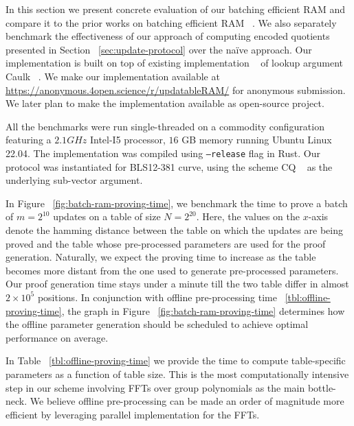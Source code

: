 In this section we present concrete evaluation of our batching efficient RAM and compare it to the
prior works on batching efficient RAM ~\cite{USENIX:OWWB20,CCS:CFHKKO22}.
We also separately benchmark the effectiveness of our approach of computing encoded quotients presented
in Section ~\ref{sec:update-protocol} over the na\"{i}ve approach.
Our implementation is built on top of existing implementation ~\cite{caulk-implementation}
of lookup argument Caulk ~\cite{CCS:ZBKMNS22}. We make our implementation available at
\url{https://anonymous.4open.science/r/updatableRAM/} for anonymous submission. We later plan to
make the implementation available as open-source project.

 All the benchmarks were run single-threaded on a commodity configuration featuring a
$2.1GHz$ Intel-I5 processor, $16$ GB memory running Ubuntu Linux 22.04. The implementation was compiled using {\tt --release}
flag in Rust. Our protocol was instantiated for BLS12-381 curve, using the scheme CQ ~\cite{EPRINT:EagFioGab22}
as the underlying sub-vector argument.

 In Figure ~\ref{fig:batch-ram-proving-time}, we benchmark the time
to prove a batch of $m=2^{10}$ updates on a table of size $N=2^{20}$. Here, the values on the $x$-axis denote
the hamming distance between the table on which the updates are being proved and the table whose pre-processed
parameters are used for the proof generation. Naturally, we expect the proving time to increase as the table
becomes more distant from the one used to generate pre-processed parameters. Our proof generation time stays
under a minute till the two table differ in almost $2\times 10^5$ positions. In conjunction with offline
pre-processing time ~\ref{tbl:offline-proving-time}, the graph in Figure ~\ref{fig:batch-ram-proving-time}
determines how the offline parameter generation should be scheduled to achieve optimal performance on average.

 In Table ~\ref{tbl:offline-proving-time} we provide the time to compute
table-specific parameters as a function of table size. This is the most computationally intensive step in our
scheme involving FFTs over group polynomials as the main bottle-neck. We believe offline pre-processing can be
made an order of magnitude more efficient by leveraging parallel implementation for the FFTs.

